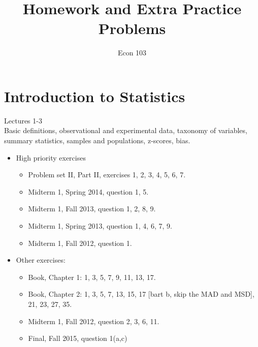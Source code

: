 \documentclass[11pt]{article}
\title{Homework and Extra Practice Problems}
\author{Econ 103}
\begin{document}
\maketitle

\section{Introduction to Statistics}
Lectures 1-3\\[0.2in]
Basic definitions, observational and experimental data, taxonomy of variables, summary statistics, samples and populations, z-scores, bias. 
	\begin{itemize}
	\item High priority exercises
	\begin{itemize}
		\item  Problem set II, Part II, exercises 1, 2, 3, 4, 5, 6, 7.
		\item Midterm 1, Spring 2014, question 1, 5.
		\item Midterm 1, Fall 2013, question 1, 2, 8, 9.
		\item Midterm 1, Spring 2013, question 1, 4, 6, 7, 9.
		\item Midterm 1, Fall 2012, question 1. 
	\end{itemize} 
	\item Other exercises:
	\begin{itemize}
		\item Book, Chapter 1: 1, 3, 5, 7, 9, 11, 13, 17.
		\item Book, Chapter 2: 1, 3, 5, 7, 13, 15, 17 [bart b, skip the MAD and MSD], 21, 23, 27, 35. 
		\item Midterm 1, Fall 2012, question 2, 3, 6, 11.
		\item Final, Fall 2015, question 1(a,c)
	\end{itemize}
	\end{itemize}
	
\end{document}
